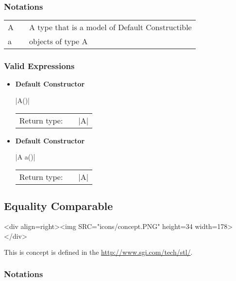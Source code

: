 \documentclass[12pt,twoside]{report}
\begin{document}
\subsubsection*{Notations}

\begin{tabular}[!h]{l l l}
A & & A type that is a model of Default Constructible\\
a & & objects of type A\\
\end{tabular}


\htmlrule[CLEAR=all]
 

\subsubsection*{Valid Expressions}
\begin{itemize}


\item {\bf Default Constructor}
  
  |A()|
  
  \begin{tabular}[!h]{l p{1cm} p{10cm}}
    Return type: & & |A| \\
  \end{tabular}
   

\item {\bf Default Constructor}
  
  |A a()|
  
  \begin{tabular}[!h]{l p{1cm} p{10cm}}
    Return type: & & |A| \\
  \end{tabular}

\end{itemize}




\subsection{Equality Comparable}
\label{concept:equality_comparable}
\begin{htmlonly}
<div align=right><img SRC="icons/concept.PNG" height=34 width=178></div>
\end{htmlonly}

This is concept is defined in the \hyperref{STL}{STL (see M. Austern, Generic Programming and the STL, Addison Wesley Longman, 1999) }{}{http://www.sgi.com/tech/stl/}.


\subsubsection*{Notations}
\end{document}
